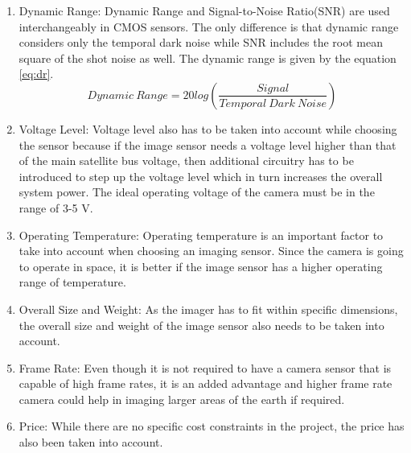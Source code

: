 \begin{enumerate}
\item Dynamic Range: Dynamic Range and Signal-to-Noise Ratio(SNR) are used interchangeably in CMOS sensors. The only difference is that dynamic range considers only the temporal dark noise while SNR includes the root mean square of the shot noise as well.  The dynamic range is given by the equation \ref{eq:dr}.
\begin{equation}
\label{eq:dr}
Dynamic \ Range = 20log(\frac{Signal}{Temporal \ Dark \ Noise})
\end{equation}

\item Voltage Level: Voltage level also has to be taken into account while choosing the sensor because if the image sensor needs a voltage level higher than that of the main satellite bus voltage, then additional circuitry has to be introduced to step up the voltage level which in turn increases the overall system power. The ideal operating voltage of the camera must be in the range of 3-5 V.

\item Operating Temperature: Operating temperature is an important factor to take into account when choosing an imaging sensor. Since the camera is going to operate in space, it is better if the image sensor has a higher operating range of temperature. 

\item Overall Size and Weight: As the imager has to fit within specific dimensions, the overall size and weight of the image sensor also needs to be taken into account.

\item Frame Rate: Even though it is not required to have a camera sensor that is capable of high frame rates, it is an added advantage and higher frame rate camera could help in imaging larger areas of the earth if required. 
\item Price: While there are no specific cost constraints in the project, the price has also been taken into account.
\end{enumerate}

